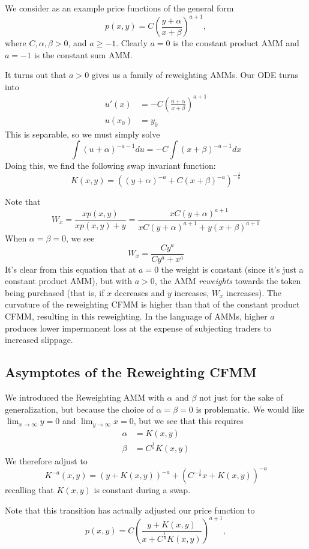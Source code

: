 \documentclass[11pt]{article} %
\begin{document}
We consider as an example price functions of the general form
$$
p(x,y) = C\left(\frac{y + \alpha}{x + \beta}\right)^{a+1},
$$
where $C,\alpha,\beta > 0$, and $a \geq -1$. Clearly $a=0$ is the constant product AMM and $a=-1$ is the constant sum AMM.

It turns out that $a>0$ gives us a family of reweighting AMMs.
Our ODE turns into
\begin{align*}
u'(x) &= - C\left(\frac{u + \alpha}{x + \beta}\right)^{a+1}\\
u(x_0) &= y_0
\end{align*}
This is separable, so we must simply solve
$$
\int (u + \alpha)^{-a-1} du = -C\int (x + \beta)^{-a-1} dx
$$
Doing this, we find the following swap invariant function:
$$
K(x,y) = \left((y + \alpha)^{-a} + C(x + \beta)^{-a}\right)^{-\frac{1}{a}}
$$

Note that
$$
W_x = \frac{xp(x,y)}{xp(x,y) + y} = \frac{xC\left(y + \alpha\right)^{a+1}}{xC\left(y + \alpha\right)^{a+1} + y(x + \beta)^{a+1}}
$$
When $\alpha = \beta = 0$, we see
$$
W_x = \frac{Cy^a}{Cy^a + x^a}
$$
It's clear from this equation that at $a=0$ the weight is constant (since it's just a constant product AMM), but with $a>0$, the AMM \emph{reweights} towards the token being purchased
(that is, if $x$ decreases and $y$ increases, $W_x$ increases).
The curvature of the reweighting CFMM is higher than that of the constant product CFMM, resulting in this reweighting.
In the language of AMMs, higher $a$ produces lower impermanent loss at the expense of subjecting traders to increased slippage.

\subsection{Asymptotes of the Reweighting CFMM}

We introduced the Reweighting AMM with $\alpha$ and $\beta$ not just for the sake of generalization, but because the choice of $\alpha = \beta = 0$ is problematic.
We would like $\lim_{x\to \infty} y = 0$ and $\lim_{y\to \infty} x = 0$, but we see that this requires
\begin{align*}
\alpha &= K(x,y)\\
\beta &= C^\frac{1}{a} K(x,y)
\end{align*}
We therefore adjust to
$$
K^{-a}(x,y) = (y + K(x,y))^{-a} + (C^{-\frac{1}{a}}x + K(x,y))^{-a}
$$
recalling that $K(x,y)$ is constant during a swap.

Note that this transition has actually adjusted our price function to
$$
p(x,y) = C\left(\frac{y + K(x,y)}{x + C^\frac{1}{a} K(x,y)}\right)^{a+1},
$$
\end{document}
